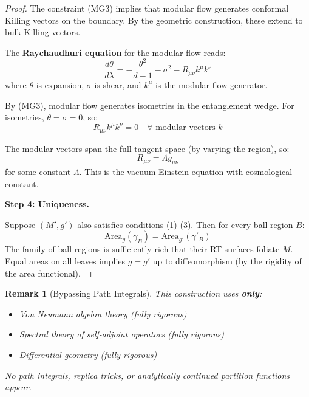 \documentclass[12pt,a4paper]{article}
\newtheorem*{remark}{Remark}
\begin{document}
\begin{proof}
The constraint (MG3) implies that modular flow generates conformal Killing vectors on the boundary. By the geometric construction, these extend to bulk Killing vectors.

The \textbf{Raychaudhuri equation} for the modular flow reads:
\begin{equation}
\frac{d\theta}{d\lambda} = -\frac{\theta^2}{d-1} - \sigma^2 - R_{\mu\nu}k^\mu k^\nu
\end{equation}
where $\theta$ is expansion, $\sigma$ is shear, and $k^\mu$ is the modular flow generator.

By (MG3), modular flow generates isometries in the entanglement wedge. For isometries, $\theta = \sigma = 0$, so:
\begin{equation}
R_{\mu\nu}k^\mu k^\nu = 0 \quad \forall \text{ modular vectors } k
\end{equation}

The modular vectors span the full tangent space (by varying the region), so:
\begin{equation}
R_{\mu\nu} = \Lambda g_{\mu\nu}
\end{equation}
for some constant $\Lambda$. This is the vacuum Einstein equation with cosmological constant.

\textbf{Step 4: Uniqueness.}

Suppose $(M', g')$ also satisfies conditions (1)-(3). Then for every ball region $B$:
\begin{equation}
\text{Area}_{g}(\gamma_B) = \text{Area}_{g'}(\gamma'_B)
\end{equation}
The family of ball regions is sufficiently rich that their RT surfaces foliate $M$. Equal areas on all leaves implies $g = g'$ up to diffeomorphism (by the rigidity of the area functional).
\end{proof}

\begin{remark}[Bypassing Path Integrals]
This construction uses \textbf{only}:
\begin{itemize}
    \item Von Neumann algebra theory (fully rigorous)
    \item Spectral theory of self-adjoint operators (fully rigorous)
    \item Differential geometry (fully rigorous)
\end{itemize}
No path integrals, replica tricks, or analytically continued partition functions appear.
\end{remark}
\end{document}
